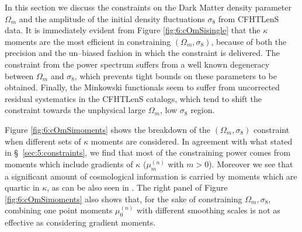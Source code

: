 In this section we discuss the constraints on the Dark Matter density parameter $\Omega_m$ and the amplitude of the initial density fluctuations $\sigma_8$ from CFHTLenS data. It is immediately evident from Figure \ref{fig:6:cOmSisingle} that the $\kappa$ moments are the most efficient in constraining $(\Omega_m,\sigma_8)$, because of both the precision and the un--biased fashion in which the constraint is delivered. The constraint from the power spectrum suffers from a well known degeneracy between $\Omega_m$ and $\sigma_8$, which prevents tight bounds on these parameters to be obtained. Finally, the Minkowski functionals seem to suffer from uncorrected residual systematics in the CFHTLenS catalogs, which tend to shift the constraint towards the unphysical large $\Omega_m$, low $\sigma_8$ region. 

Figure \ref{fig:6:cOmSimoments} shows the breakdown of the $(\Omega_m,\sigma_8)$ constraint when different sets of $\kappa$ moments are considered. In agreement with what stated in \S~\ref{sec:5:constraints}, we find that most of the constraining power comes from moments which include gradients of $\kappa$ ($\mu_{m}^{(n)}$ with $m>0$). Moreover we see that a significant amount of cosmological information is carried by moments which are quartic in $\kappa$, as can be also seen in \citep{JainKurt}. The right panel of Figure \ref{fig:6:cOmSimoments} also shows that, for the sake of constraining $\Omega_m,\sigma_8$, combining one point moments $\mu_0^{(n)}$ with different smoothing scales is not as effective as considering gradient moments.  


